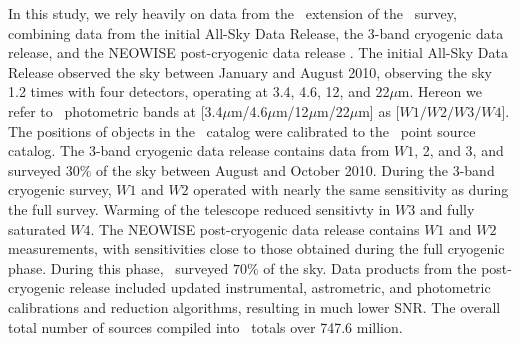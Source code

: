 In this study, we rely heavily on data from the \allwise\, extension of the \wise\, survey, combining data from the initial All-Sky Data Release, the 3-band cryogenic data release, and the NEOWISE post-cryogenic data release \citep{2013wise.rept....1C}. The initial \wise All-Sky Data Release observed the sky between January and August 2010, observing the sky 1.2 times with four detectors, operating at 3.4, 4.6, 12, and 22$\mu$m. Hereon we refer to \allwise\, photometric bands at [3.4$\mu$m/4.6$\mu$m/12$\mu$m/22$\mu$m] as [$W1/W2/W3/W4$]. The positions of objects in the \wise\, catalog were calibrated to the \twomass\, point source catalog. The 3-band cryogenic data release contains data from $W1$, 2, and 3, and surveyed $30\%$ of the sky between August and October 2010. During the 3-band cryogenic survey, $W1$ and $W2$ operated with nearly the same sensitivity as during the full survey. Warming of the telescope reduced sensitivty in $W3$ and fully saturated $W4$. The NEOWISE post-cryogenic data release contains $W1$ and $W2$ measurements, with sensitivities close to those obtained during the full cryogenic phase. During this phase, \wise\, surveyed $70\%$ of the sky. Data products from the post-cryogenic release included updated instrumental, astrometric, and photometric calibrations and reduction algorithms, resulting in much lower SNR. The overall total number of sources compiled into \allwise\, totals over 747.6 million.

